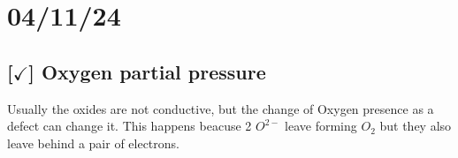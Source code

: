 \section{04/11/24}

\subsection{[$\checkmark$] Oxygen partial pressure}

Usually the oxides are not conductive, but the change of Oxygen presence as a defect can change it. This happens beacuse 2 $O^{2-}$ leave forming $O_2$ but they also leave behind a pair of electrons.